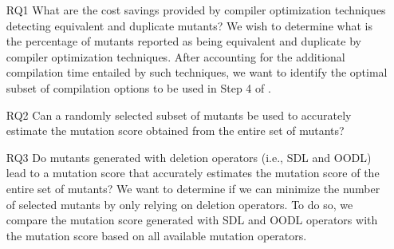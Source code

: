 \begin{itemize}

    \item[RQ1]  What are the cost savings provided by compiler optimization techniques detecting equivalent and duplicate mutants?
    We wish to determine what is the percentage of mutants reported as being equivalent and duplicate by compiler optimization techniques. After accounting for the additional compilation time entailed by such techniques, we want to identify the optimal subset of compilation options to be used in Step 4 of \APPR.

    \item[RQ2]  Can a randomly selected subset of mutants be used to accurately estimate the mutation score obtained from the entire set of mutants?



    \item[RQ3]  {Do mutants generated with deletion operators (i.e., SDL and OODL) lead to a mutation score that accurately estimates the mutation score of the entire set of mutants?
   We want to determine if we can minimize the number of selected mutants by only relying on deletion operators. To do so, we compare the mutation score generated with SDL and OODL operators with the mutation score based on all available mutation operators. }



\end{itemize}
